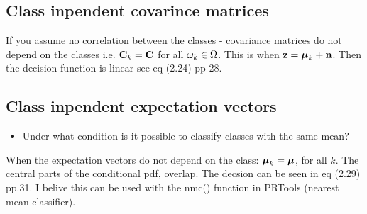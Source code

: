 \subsection{Class inpendent covarince matrices}
\label{sub:Class inpendent covarince matrices}
If you assume no correlation between the classes - covariance matrices do not depend on the classes i.e. $\mathbf{C}_k = \mathbf{C}$ for all $\omega_k \in \Omega$. This is when $\mathbf{z} = \boldsymbol\mu_k + \mathbf{n}$. Then the decision function is linear see eq (2.24) pp 28.

\subsection{Class inpendent expectation vectors}
\begin{itemize}
    \item Under what condition is it possible to classify classes with the same mean?
\end{itemize}
When the expectation vectors do not depend on the class: $\boldsymbol\mu_k = \boldsymbol\mu$, for all $k$. The central parts of the conditional pdf, overlap. The decsion can be seen in eq (2.29) pp.31.
I belive this can be used with the nmc() function in PRTools (nearest mean classifier). 










\label{task:20140926_jm1}
